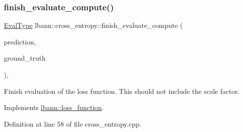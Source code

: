 \subsubsection{\texorpdfstring{finish\+\_\+evaluate\+\_\+compute()}{finish\_evaluate\_compute()}}
{\footnotesize\ttfamily \hyperlink{base_8hpp_a3266f5ac18504bbadea983c109566867}{Eval\+Type} lbann\+::cross\+\_\+entropy\+::finish\+\_\+evaluate\+\_\+compute (\begin{DoxyParamCaption}\item[{const \hyperlink{base_8hpp_a9a697a504ae84010e7439ffec862b470}{Abs\+Dist\+Mat} \&}]{prediction,  }\item[{const \hyperlink{base_8hpp_a9a697a504ae84010e7439ffec862b470}{Abs\+Dist\+Mat} \&}]{ground\+\_\+truth }\end{DoxyParamCaption})\hspace{0.3cm}{\ttfamily [override]}, {\ttfamily [virtual]}}

Finish evaluation of the loss function. This should not include the scale factor. 

Implements \hyperlink{classlbann_1_1loss__function_a3ea8553a4e9c75477d7d4fc533c4d4fd}{lbann\+::loss\+\_\+function}.



Definition at line 58 of file cross\+\_\+entropy.\+cpp.


